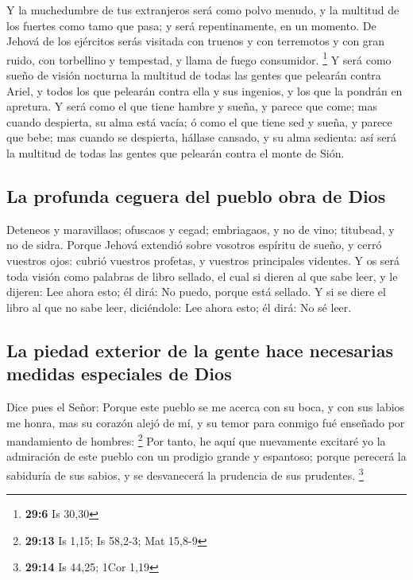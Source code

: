  Y la muchedumbre de tus extranjeros será como polvo
menudo, y la multitud de los fuertes como tamo que pasa; y será
repentinamente, en un momento.  De Jehová de los ejércitos
serás visitada con truenos y con terremotos y con gran ruido, con
torbellino y tempestad, y llama de fuego consumidor. \footnote{\textbf{29:6}
  Is 30,30}  Y será como sueño de visión nocturna la
multitud de todas las gentes que pelearán contra Ariel, y todos los que
pelearán contra ella y sus ingenios, y los que la pondrán en apretura.
 Y será como el que tiene hambre y sueña, y parece que
come; mas cuando despierta, su alma está vacía; ó como el que tiene sed
y sueña, y parece que bebe; mas cuando se despierta, hállase cansado, y
su alma sedienta: así será la multitud de todas las gentes que pelearán
contra el monte de Sión.

\hypertarget{la-profunda-ceguera-del-pueblo-obra-de-dios}{%
\subsection{La profunda ceguera del pueblo obra de
Dios}\label{la-profunda-ceguera-del-pueblo-obra-de-dios}}

 Deteneos y maravillaos; ofuscaos y cegad; embriagaos, y
no de vino; titubead, y no de sidra.  Porque Jehová
extendió sobre vosotros espíritu de sueño, y cerró vuestros ojos: cubrió
vuestros profetas, y vuestros principales videntes.  Y os
será toda visión como palabras de libro sellado, el cual si dieren al
que sabe leer, y le dijeren: Lee ahora esto; él dirá: No puedo, porque
está sellado.  Y si se diere el libro al que no sabe
leer, diciéndole: Lee ahora esto; él dirá: No sé leer.

\hypertarget{la-piedad-exterior-de-la-gente-hace-necesarias-medidas-especiales-de-dios}{%
\subsection{La piedad exterior de la gente hace necesarias medidas
especiales de
Dios}\label{la-piedad-exterior-de-la-gente-hace-necesarias-medidas-especiales-de-dios}}

 Dice pues el Señor: Porque este pueblo se me acerca con
su boca, y con sus labios me honra, mas su corazón alejó de mí, y su
temor para conmigo fué enseñado por mandamiento de hombres: \footnote{\textbf{29:13}
  Is 1,15; Is 58,2-3; Mat 15,8-9}  Por tanto, he aquí que
nuevamente excitaré yo la admiración de este pueblo con un prodigio
grande y espantoso; porque perecerá la sabiduría de sus sabios, y se
desvanecerá la prudencia de sus prudentes. \footnote{\textbf{29:14} Is
  44,25; 1Cor 1,19}

